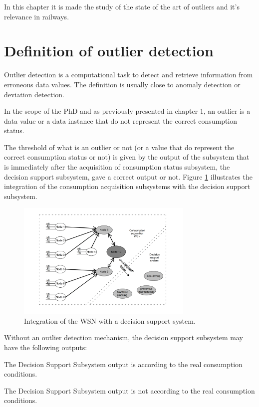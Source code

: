 In this chapter it is  made the study of the state of the art of outliers and it's relevance in railways.


\section{Definition of outlier detection}

Outlier detection is a computational task to detect and retrieve information from erroneous data values. The definition is usually close to anomaly detection or deviation detection. 


In the scope of the PhD and as previously presented in chapter 1, an outlier is a data value or a data instance that do not represent the correct consumption status.

The threshold of what is an outlier or not (or a value that do represent the correct consumption status or not) is given by the output of the subsystem that is immediately after the acquisition of consumption status subsystem, the decision support subsystem, gave a correct output or not. Figure \ref{fig:general} illustrates the integration of the consumption acquisition subsystems with the decision support subsystem.


\begin{figure}[h!]
	\centering
	\includegraphics[width=0.75\textwidth,keepaspectratio]{figures/general}
	\caption{Integration of the WSN with a decision support system. }
	\label{fig:general}
\end{figure}

Without an outlier detection mechanism, the decision support subsystem may have the following outputs:


\begin{description}
	\setlength\itemsep{-0.5em}
	\item[Input deviation from real value lower than a threshold]
	The Decision Support Subsystem output is according to the real consumption conditions.
	\item[Input deviation from real value greater than a threshold]
	The Decision Support Subsystem output is not according to the real consumption conditions.	
\end{description}

